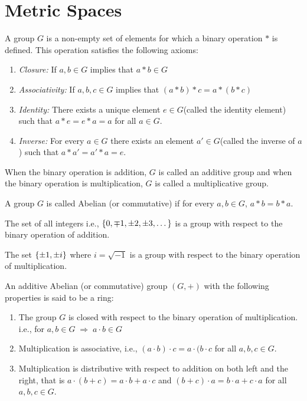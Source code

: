 \documentclass[../main-sheet.tex]{subfiles}
\begin{document}
\chapter{Metric Spaces}
\begin{defn}[Group]
A group $ G $ is a non-empty set of elements for which a binary operation $ * $ is defined. This operation satisfies the following axioms:
\begin{enumerate}[label=(\roman*)]
    \item \emph{Closure:} If $ a,b \in G $ implies that $ a*b\in G $
    \item \emph{Associativity:} If $ a,b,c \in G $ implies that $ (a*b)*c=a*(b*c) $
    \item \emph{Identity:} There exists a unique element $ e\in G $(called the identity element) such that $ a*e=e*a=a $ for all $ a\in G $.
    \item \emph{Inverse:} For every $ a\in G $ there exists an element $ a'\in G $(called the inverse of $ a $) such that $ a*a'=a'*a=e $.
\end{enumerate}
\end{defn}
\begin{note}
    When the binary operation is addition, $ G $ is called an additive group and when the binary operation is multiplication, $ G $ is called a multiplicative group.
\end{note}
\begin{defn}
    A group $ G $ is called Abelian (or commutative) if for every $ a,b\in G $, $ a*b=b*a $.
\end{defn}
\begin{ex}
    The set of all integers i.e., $ \left\{0,\mp 1,\pm2,\pm3,\dots\right\} $ is a group with respect to the binary operation of addition.
\end{ex}
\begin{ex}
    The set $ \left\{\pm 1,\pm i\right\} $ where $ i=\sqrt{-1} $ is a group with respect to the binary operation of multiplication.
\end{ex}
\begin{defn}[Ring]
An additive Abelian (or commutative) group $ (G,+) $ with the following properties is said to be a ring:
\begin{enumerate}[label=(\roman*)]
    \item The group $ G $ is closed with respect to the binary operation of multiplication. i.e., for $ a,b\in G\;\Rightarrow\; a\cdot b\in G $
    \item Multiplication is associative, i.e., $ (a\cdot b)\cdot c=a\cdot (b\cdot c$ for all $ a,b,c\in G $.
    \item Multiplication is distributive with respect to addition on both left and the right, that is $ a\cdot (b+c)=a\cdot b+a\cdot c $ and $ (b+c)\cdot a=b\cdot a+c\cdot a $ for all $ a,b,c\in G $.
\end{enumerate}
\end{defn}
\end{document}
